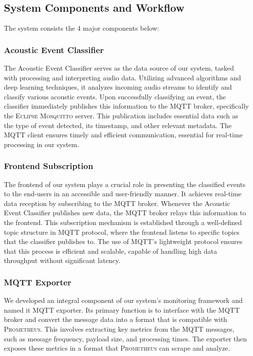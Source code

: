 \subsection{System Components and Workflow}
The system consists the 4 major components below:
\subsubsection{Acoustic Event Classifier}
The Acoustic Event Classifier serves as the data source of our system, tasked with processing and interpreting audio data. Utilizing advanced algorithms and deep learning techniques, it analyzes incoming audio streams to identify and classify various acoustic events. Upon successfully classifying an event, the classifier immediately publishes this information to the MQTT broker, specifically the \textsc{Eclipse Mosquitto} server. This publication includes essential data such as the type of event detected, its timestamp, and other relevant metadata. The MQTT client ensures timely and efficient communication, essential for real-time processing in our system.

\subsubsection{Frontend Subscription}
The frontend of our system plays a crucial role in presenting the classified events to the end-users in an accessible and user-friendly manner. It achieves real-time data reception by subscribing to the MQTT broker. Whenever the Acoustic Event Classifier publishes new data, the MQTT broker relays this information to the frontend. This subscription mechanism is established through a well-defined topic structure in MQTT protocol, where the frontend listens to specific topics that the classifier publishes to. The use of MQTT’s lightweight protocol ensures that this process is efficient and scalable, capable of handling high data throughput without significant latency.

\subsubsection{MQTT Exporter}
We developed an integral component of our system's monitoring framework and named it MQTT exporter. Its primary function is to interface with the MQTT broker and convert the message data into a format that is compatible with \textsc{Prometheus}. This involves extracting key metrics from the MQTT messages, such as message frequency, payload size, and processing times. The exporter then exposes these metrics in a format that \textsc{Prometheus} can scrape and analyze.

